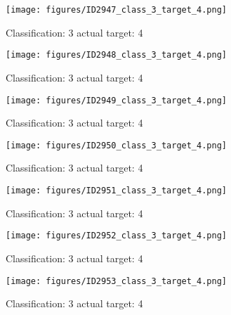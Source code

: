 \begin{figure}[h!]
\begin{center}
\texttt{[image: figures/ID2947\_class\_3\_target\_4.png]}
\end{center}
\caption{ Classification: 3 actual target: 4}
\label{fig:ID2947_class_3_target_4}
\end{figure}
\begin{figure}[h!]
\begin{center}
\texttt{[image: figures/ID2948\_class\_3\_target\_4.png]}
\end{center}
\caption{ Classification: 3 actual target: 4}
\label{fig:ID2948_class_3_target_4}
\end{figure}
\begin{figure}[h!]
\begin{center}
\texttt{[image: figures/ID2949\_class\_3\_target\_4.png]}
\end{center}
\caption{ Classification: 3 actual target: 4}
\label{fig:ID2949_class_3_target_4}
\end{figure}
\begin{figure}[h!]
\begin{center}
\texttt{[image: figures/ID2950\_class\_3\_target\_4.png]}
\end{center}
\caption{ Classification: 3 actual target: 4}
\label{fig:ID2950_class_3_target_4}
\end{figure}
\begin{figure}[h!]
\begin{center}
\texttt{[image: figures/ID2951\_class\_3\_target\_4.png]}
\end{center}
\caption{ Classification: 3 actual target: 4}
\label{fig:ID2951_class_3_target_4}
\end{figure}
\begin{figure}[h!]
\begin{center}
\texttt{[image: figures/ID2952\_class\_3\_target\_4.png]}
\end{center}
\caption{ Classification: 3 actual target: 4}
\label{fig:ID2952_class_3_target_4}
\end{figure}
\begin{figure}[h!]
\begin{center}
\texttt{[image: figures/ID2953\_class\_3\_target\_4.png]}
\end{center}
\caption{ Classification: 3 actual target: 4}
\label{fig:ID2953_class_3_target_4}
\end{figure}
